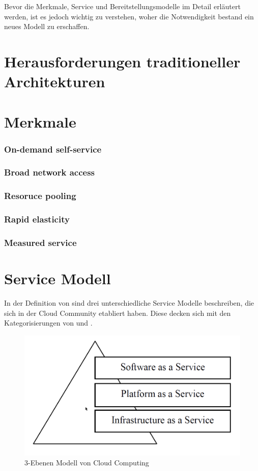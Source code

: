 Bevor die Merkmale, Service  und Bereitstellungsmodelle im Detail erläutert werden, ist es jedoch wichtig zu verstehen, woher die Notwendigkeit bestand ein neues Modell zu erschaffen.

\section{Herausforderungen traditioneller Architekturen} \label{herausforderungen}


\section{Merkmale}
\subsubsection{On-demand self-service}\label{selfservice}
\subsubsection{Broad network access}\label{networkaccess}
\subsubsection{Resoruce pooling}\label{resourcepooling}
\subsubsection{Rapid elasticity}\label{rapidelasticity}
\subsubsection{Measured service}\label{measuredservice}
\cite*[vgl.][S.2]{Mell.2011}

\section{Service Modell}
In der Definition von \cite*[S.2]{Mell.2011} sind drei unterschiedliche Service Modelle beschreiben, die sich in der Cloud Community etabliert haben. Diese decken sich mit den Kategorisierungen von \cite[S. 28]{Tharam.2010} und \cite[S. 878]{Jadeja.2012}.

	\begin{figure}[h]
		\centering
		\includegraphics[width=0.7\linewidth]{images/cloud_computing_pyramide}
		\caption{3-Ebenen Modell von Cloud Computing}
		\label{fig:CloudComputingPyramide}
	\end{figure}


